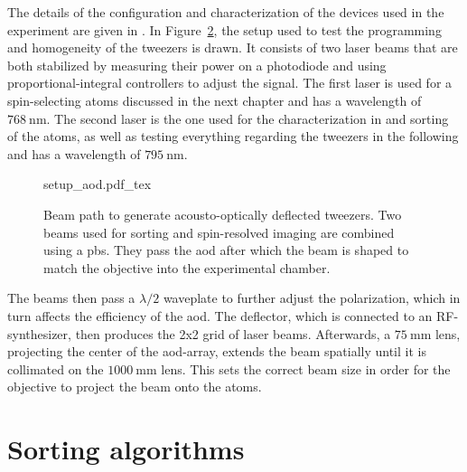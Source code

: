 \begin{figure}[ht]
	\label{fig:aod_pass}
\end{figure}

The details of the configuration and characterization of the devices used in the experiment are given in \cite{Osterholz2020}.
In Figure~\ref{fig:setup_aod}, the setup used to test the programming and homogeneity of the tweezers is drawn. It consists of two laser beams that are both stabilized by measuring their power on a photodiode and using proportional-integral controllers to adjust the signal. The first laser is used for a spin-selecting atoms discussed in the next chapter and has a wavelength of $\SI{768}{\nano\meter}$. The second laser is the one used for the characterization in \cite{Osterholz2020} and sorting of the atoms, as well as testing everything regarding the tweezers in the following and has a wavelength of $\SI{795}{\nano\meter}$.

\begin{figure}[t]
\label{fig:setup_aod}
\centering
	{setup_aod.pdf_tex}
	\caption{Beam path to generate acousto-optically deflected tweezers. Two beams used for sorting and spin-resolved imaging are combined using a \ac{pbs}. They pass the \ac{aod} after which the beam is shaped to match the objective into the experimental chamber.}
\end{figure}

The beams then pass a $\lambda/2$ waveplate to further adjust the polarization, which in turn affects the efficiency of the \ac{aod}. The deflector, which is connected to an RF-synthesizer, then produces the 2x2 grid of laser beams. Afterwards, a $\SI{75}{\milli\meter}$ lens, projecting the center of the \ac{aod}-array, extends the beam spatially until it is collimated on the $\SI{1000}{\milli\meter}$ lens. This sets the correct beam size in order for the objective to project the beam onto the atoms.

\section{Sorting algorithms}

